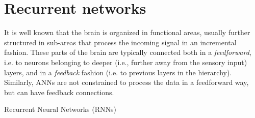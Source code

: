 \section{Recurrent networks}\label{sec:rnn}
%
It is well known that the brain is organized in functional areas, usually
further structured in sub-areas that process the incoming signal in an
incremental fashion. These parts of the brain are typically connected both in a
\emph{feedforward}, i.e. to neurons belonging to deeper (i.e., further away
from the sensory input) layers, and in a \emph{feedback} fashion (i.e. to
previous layers in the hierarchy). Similarly, ANNs are not constrained to
process the data in a feedforward way, but can have feedback connections.

Recurrent Neural Networks (RNNs)
